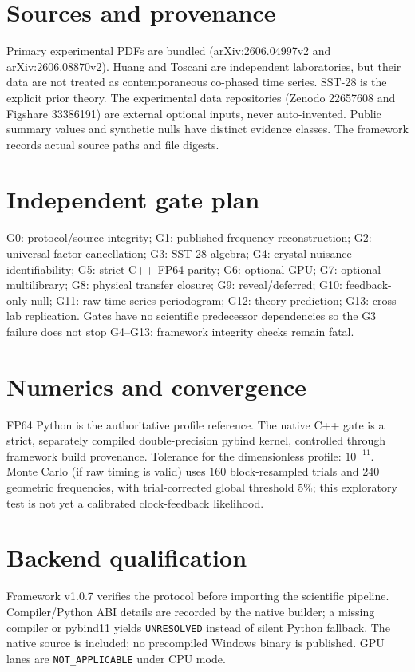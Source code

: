 \documentclass[11pt,a4paper]{article}
\begin{document}
\section{Sources and provenance}
Primary experimental PDFs are bundled (arXiv:2606.04997v2 and arXiv:2606.08870v2). Huang and Toscani are independent laboratories, but their data are not treated as contemporaneous co-phased time series. SST-28 is the explicit prior theory. The experimental data repositories (Zenodo 22657608 and Figshare 33386191) are external optional inputs, never auto-invented. Public summary values and synthetic nulls have distinct evidence classes. The framework records actual source paths and file digests.
\section{Independent gate plan}
G0: protocol/source integrity; G1: published frequency reconstruction; G2: universal-factor cancellation; G3: SST-28 algebra; G4: crystal nuisance identifiability; G5: strict C++ FP64 parity; G6: optional GPU; G7: optional multilibrary; G8: physical transfer closure; G9: reveal/deferred; G10: feedback-only null; G11: raw time-series periodogram; G12: theory prediction; G13: cross-lab replication. Gates have no scientific predecessor dependencies so the G3 failure does not stop G4--G13; framework integrity checks remain fatal.
\section{Numerics and convergence}
FP64 Python is the authoritative profile reference. The native C++ gate is a strict, separately compiled double-precision pybind kernel, controlled through framework build provenance. Tolerance for the dimensionless profile: $10^{-11}$. Monte Carlo (if raw timing is valid) uses $160$ block-resampled trials and 240 geometric frequencies, with trial-corrected global threshold 5\%; this exploratory test is not yet a calibrated clock-feedback likelihood.
\section{Backend qualification}
Framework v1.0.7 verifies the protocol before importing the scientific pipeline. Compiler/Python ABI details are recorded by the native builder; a missing compiler or pybind11 yields \texttt{UNRESOLVED} instead of silent Python fallback. The native source is included; no precompiled Windows binary is published. GPU lanes are \texttt{NOT\_APPLICABLE} under CPU mode.
\end{document}
